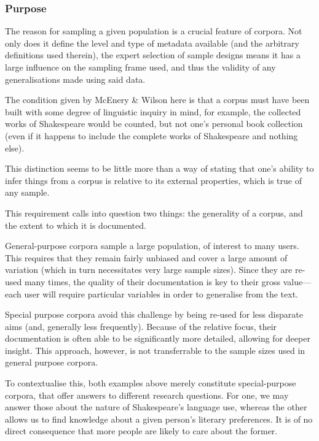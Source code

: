 \subsubsection{Purpose}
The reason for sampling a given population is a crucial feature of corpora.  Not only does it define the level and type of metadata available (and the arbitrary definitions used therein), the expert selection of sample designs means it has a large influence on the sampling frame used, and thus the validity of any generalisations made using said data.

The condition given by McEnery \& Wilson\cite{mcenery2001corpus} here is that a corpus must have been built with some degree of linguistic inquiry in mind, for example, the collected works of Shakespeare would be counted, but not one's personal book collection (even if it happens to include the complete works of Shakespeare and nothing else).

This distinction seems to be little more than a way of stating that one's ability to infer things from a corpus is relative to its external properties, which is true of any sample.

This requirement calls into question two things: the generality of a corpus, and the extent to which it is documented.

General-purpose corpora sample a large population, of interest to many users.  This requires that they remain fairly unbiased and cover a large amount of variation (which in turn necessitates very large sample sizes).  Since they are re-used many times, the quality of their documentation is key to their gross value---each user will require particular variables in order to generalise from the text.

Special purpose corpora avoid this challenge by being re-used for less disparate aims (and, generally less frequently).  Because of the relative focus, their documentation is often able to be significantly more detailed, allowing for deeper insight.  This approach, however, is not transferrable to the sample sizes used in general purpose corpora.

To contextualise this, both examples above merely constitute special-purpose corpora, that offer answers to different research questions.  For one, we may answer those about the nature of Shakespeare's language use, whereas the other allows us to find knowledge about a given person's literary preferences.  It is of no direct consequence that more people are likely to care about the former.

